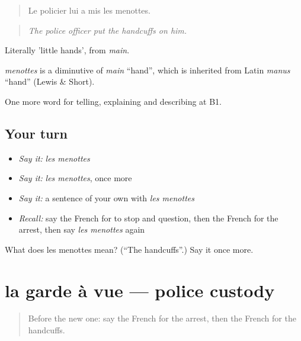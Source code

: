 \begin{quote}
Le policier lui a mis les menottes.
\end{quote}

\begin{quote}
\emph{The police officer put the handcuffs on him.}
\end{quote}

Literally 'little hands', from \emph{main}.

\begin{cousinweb}
\emph{menottes} is a diminutive of \emph{main} \textquotedblleft{}hand\textquotedblright{}, which is inherited from Latin \emph{manus} \textquotedblleft{}hand\textquotedblright{} (Lewis \& Short).
\end{cousinweb}

\begin{grammarlens}[title={What you've built}]
One more word for telling, explaining and describing at B1.
\end{grammarlens}

\subsection*{Your turn}
\begin{itemize}
\raggedright
  \item \emph{Say it:} \emph{les menottes}
  \item \emph{Say it:} \emph{les menottes}, once more
  \item \emph{Say it:} a sentence of your own with \emph{les menottes}
  \item \emph{Recall:} say the French for to stop and question, then the French for the arrest, then say \emph{les menottes} again
\end{itemize}

\begin{tcolorbox}[breakable,colback=teal!4,colframe=teal!35!black,title={Before you move on}]
What does les menottes mean? (\textquotedblleft{}The handcuffs\textquotedblright{}.) Say it once more.
\end{tcolorbox}
\section[la garde à vue]{la garde à vue — police custody}

\label{lesson:FR-C294-garde-a-vue}



\begin{quote}
Before the new one: say the French for the arrest, then the French for the handcuffs.
\end{quote}

